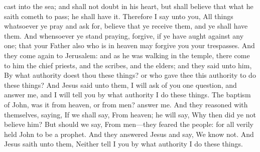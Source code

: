 cast into the sea; and shall not doubt in his heart, but shall believe that what he saith cometh to pass; he shall have it. Therefore I say unto you, All things whatsoever ye pray and ask for, believe that ye receive them, and ye shall have them. And whensoever ye stand praying, forgive, if ye have aught against any one; that your Father also who is in heaven may forgive you your trespasses.   And they come again to Jerusalem: and as he was walking in the temple, there come to him the chief priests, and the scribes, and the elders; and they said unto him, By what authority doest thou these things? or who gave thee this authority to do these things? And Jesus said unto them, I will ask of you one question, and answer me, and I will tell you by what authority I do these things. The baptism of John, was it from heaven, or from men? answer me. And they reasoned with themselves, saying, If we shall say, From heaven; he will say, Why then did ye not believe him? But should we say, From men—they feared the people: for all verily held John to be a prophet. And they answered Jesus and say, We know not. And Jesus saith unto them, Neither tell I you by what authority I do these things. 

